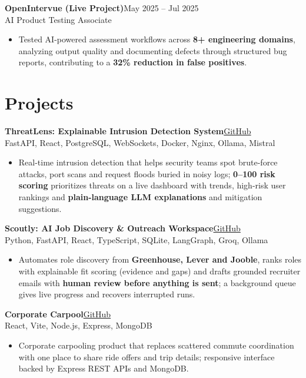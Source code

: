 \documentclass[letterpaper,10pt]{article}
\newcommand{\entry}[4]{%
  \vspace{2pt}\noindent\textbf{#1}\hfill #2\\
  #3\hfill #4\par\vspace{-1pt}}
\newcommand{\projentry}[4]{%
  \vspace{2pt}\noindent\textbf{#1}\hfill #2\\
  #4\par\vspace{-1pt}}
\begin{document}
\entry{OpenIntervue (Live Project)}{May 2025 -- Jul 2025}{AI Product Testing Associate}{}
\begin{itemize}
  \small
  \item Tested AI-powered assessment workflows across \textbf{8+ engineering domains}, analyzing output quality and documenting defects through structured bug reports, contributing to a \textbf{32\% reduction in false positives}.
\end{itemize}

\section{Projects}

\projentry{ThreatLens: Explainable Intrusion Detection System}{\href{https://github.com/harshitha7104/Threat-Lens}{GitHub}}{}{\small FastAPI, React, PostgreSQL, WebSockets, Docker, Nginx, Ollama, Mistral}
\begin{itemize}
  \small
  \item Real-time intrusion detection that helps security teams spot brute-force attacks, port scans and request floods buried in noisy logs; \textbf{0--100 risk scoring} prioritizes threats on a live dashboard with trends, high-risk user rankings and \textbf{plain-language LLM explanations} and mitigation suggestions.
\end{itemize}

\projentry{Scoutly: AI Job Discovery \& Outreach Workspace}{\href{https://github.com/harshitha7104/cold-email-agent}{GitHub}}{}{\small Python, FastAPI, React, TypeScript, SQLite, LangGraph, Groq, Ollama}
\begin{itemize}
  \small
  \item Automates role discovery from \textbf{Greenhouse, Lever and Jooble}, ranks roles with explainable fit scoring (evidence and gaps) and drafts grounded recruiter emails with \textbf{human review before anything is sent}; a background queue gives live progress and recovers interrupted runs.
\end{itemize}

\projentry{Corporate Carpool}{\href{https://github.com/harshitha7104/corporate-carpool}{GitHub}}{}{\small React, Vite, Node.js, Express, MongoDB}
\begin{itemize}
  \small
  \item Corporate carpooling product that replaces scattered commute coordination with one place to share ride offers and trip details; responsive interface backed by Express REST APIs and MongoDB.
\end{itemize}
\end{document}
